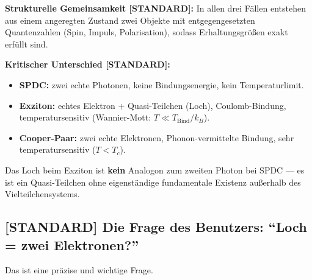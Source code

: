 \begin{center}
\end{center}

\textbf{Strukturelle Gemeinsamkeit [STANDARD]:}
In allen drei Fällen entstehen aus einem angeregten Zustand
zwei Objekte mit entgegengesetzten Quantenzahlen
(Spin, Impuls, Polarisation), sodass Erhaltungsgrößen exakt erfüllt sind.

\textbf{Kritischer Unterschied [STANDARD]:}
\begin{itemize}
  \item \textbf{SPDC:} zwei echte Photonen, keine Bindungsenergie,
    kein Temperaturlimit.
  \item \textbf{Exziton:} echtes Elektron + Quasi-Teilchen (Loch),
    Coulomb-Bindung, temperatursensitiv (Wannier-Mott: $T \ll T_\text{Bind}/k_B$).
  \item \textbf{Cooper-Paar:} zwei echte Elektronen, Phonon-vermittelte
    Bindung, sehr temperatursensitiv ($T < T_c$).
\end{itemize}

Das Loch beim Exziton ist \textbf{kein} Analogon zum zweiten Photon
bei SPDC --- es ist ein Quasi-Teilchen ohne eigenständige
fundamentale Existenz außerhalb des Vielteilchensystems.

\subsection{[STANDARD] Die Frage des Benutzers: ``Loch = zwei Elektronen?''}

Das ist eine präzise und wichtige Frage.

